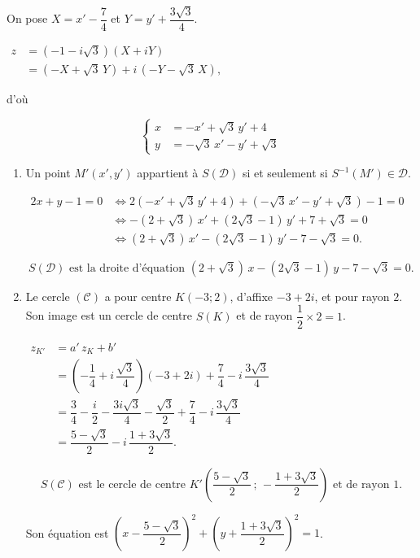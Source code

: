 \documentclass[12pt,a4paper]{article}
\begin{document}
\begin{enumerate}
    On pose $X = x' - \dfrac74$ et $Y = y' + \dfrac{3\sqrt3}{4}$.

    $
    \begin{aligned}
    z &= (-1 - i\sqrt3)(X + iY) \\[1mm]
      &= (-X + \sqrt3\,Y) + i\,(-Y - \sqrt3\,X),
    \end{aligned}
    $

    d'où

    \[
    \left\{
    \begin{aligned}
    x &= -x' + \sqrt3\,y' + 4 \\
    y &= -\sqrt3\,x' - y' + \sqrt3
    \end{aligned}
    \right.
    \]

    \begin{enumerate}

        \item Un point $M'(x',y')$ appartient à $S(\mathscr{D})$ si et seulement si $S^{-1}(M') \in \mathscr{D}$.

        $
        \begin{aligned}
        2x + y - 1 = 0 &\iff 2\left(-x' + \sqrt3\,y' + 4\right) + \left(-\sqrt3\,x' - y' + \sqrt3\right) - 1 = 0 \\[1mm]
                       &\iff -(2 + \sqrt3)\,x' + (2\sqrt3 - 1)\,y' + 7 + \sqrt3 = 0 \\[1mm]
                       &\iff (2 + \sqrt3)\,x' - (2\sqrt3 - 1)\,y' - 7 - \sqrt3 = 0.
        \end{aligned}
        $

        \[
        \boxed{S(\mathscr{D}) \text{ est la droite d'équation } (2 + \sqrt3)\,x - (2\sqrt3 - 1)\,y - 7 - \sqrt3 = 0.}
        \]

        \item Le cercle $(\mathscr{C})$ a pour centre $K(-3 ; 2)$, d'affixe $-3 + 2i$, et pour rayon $2$.
        Son image est un cercle de centre $S(K)$ et de rayon $\dfrac12 \times 2 = 1$.

        $
        \begin{aligned}
        z_{K'} &= a'\,z_K + b' \\[1mm]
               &= \left(-\dfrac14 + i\,\dfrac{\sqrt3}{4}\right)(-3 + 2i) + \dfrac74 - i\,\dfrac{3\sqrt3}{4} \\[1mm]
               &= \dfrac34 - \dfrac{i}{2} - \dfrac{3i\sqrt3}{4} - \dfrac{\sqrt3}{2} + \dfrac74 - i\,\dfrac{3\sqrt3}{4} \\[1mm]
               &= \dfrac{5 - \sqrt3}{2} - i\,\dfrac{1 + 3\sqrt3}{2}.
        \end{aligned}
        $

        \[
        \boxed{S(\mathscr{C}) \text{ est le cercle de centre } K'\left(\dfrac{5 - \sqrt3}{2}\, ;\, -\dfrac{1 + 3\sqrt3}{2}\right) \text{ et de rayon } 1.}
        \]

        Son équation est $\left(x - \dfrac{5 - \sqrt3}{2}\right)^2 + \left(y + \dfrac{1 + 3\sqrt3}{2}\right)^2 = 1$.

    \end{enumerate}

\end{enumerate}
\end{document}
